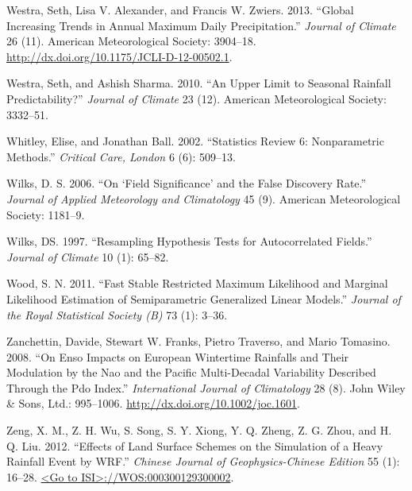 \documentclass[fleqn,10pt,lineno]{wlpeerj} %
\begin{document}
\hypertarget{ref-Westra2013}{}
Westra, Seth, Lisa V. Alexander, and Francis W. Zwiers. 2013. ``Global
Increasing Trends in Annual Maximum Daily Precipitation.'' \emph{Journal
of Climate} 26 (11). American Meteorological Society: 3904--18.
\url{http://dx.doi.org/10.1175/JCLI-D-12-00502.1}.

\hypertarget{ref-Westra2010}{}
Westra, Seth, and Ashish Sharma. 2010. ``An Upper Limit to Seasonal
Rainfall Predictability?'' \emph{Journal of Climate} 23 (12). American
Meteorological Society: 3332--51.

\hypertarget{ref-Whitley2002}{}
Whitley, Elise, and Jonathan Ball. 2002. ``Statistics Review 6:
Nonparametric Methods.'' \emph{Critical Care, London} 6 (6): 509--13.

\hypertarget{ref-Wilks2006}{}
Wilks, D. S. 2006. ``On `Field Significance' and the False Discovery
Rate.'' \emph{Journal of Applied Meteorology and Climatology} 45 (9).
American Meteorological Society: 1181--9.

\hypertarget{ref-Wilks1997}{}
Wilks, DS. 1997. ``Resampling Hypothesis Tests for Autocorrelated
Fields.'' \emph{Journal of Climate} 10 (1): 65--82.

\hypertarget{ref-Wood2011}{}
Wood, S. N. 2011. ``Fast Stable Restricted Maximum Likelihood and
Marginal Likelihood Estimation of Semiparametric Generalized Linear
Models.'' \emph{Journal of the Royal Statistical Society (B)} 73 (1):
3--36.

\hypertarget{ref-Zanchettin2008}{}
Zanchettin, Davide, Stewart W. Franks, Pietro Traverso, and Mario
Tomasino. 2008. ``On Enso Impacts on European Wintertime Rainfalls and
Their Modulation by the Nao and the Pacific Multi-Decadal Variability
Described Through the Pdo Index.'' \emph{International Journal of
Climatology} 28 (8). John Wiley \& Sons, Ltd.: 995--1006.
\url{http://dx.doi.org/10.1002/joc.1601}.

\hypertarget{ref-Zeng2012}{}
Zeng, X. M., Z. H. Wu, S. Song, S. Y. Xiong, Y. Q. Zheng, Z. G. Zhou,
and H. Q. Liu. 2012. ``Effects of Land Surface Schemes on the Simulation
of a Heavy Rainfall Event by WRF.'' \emph{Chinese Journal of
Geophysics-Chinese Edition} 55 (1): 16--28.
\href{\%3CGo\%20to\%20ISI\%3E://WOS:000300129300002}{\textless{}Go to ISI\textgreater{}://WOS:000300129300002}.
\end{document}
